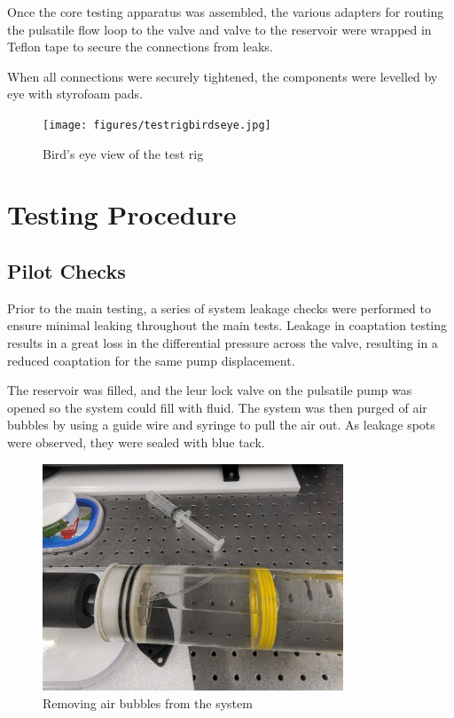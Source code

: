 Once the core testing apparatus was assembled, the various adapters for routing the pulsatile flow loop to the valve and valve to the reservoir were wrapped in Teflon tape to secure the connections from leaks.

When all connections were securely tightened, the components were levelled by eye with styrofoam pads.
\begin{figure}
    \centering
    \texttt{[image: figures/testrigbirdseye.jpg]}
    \caption{Bird's eye view of the test rig}
    \label{fig:rig}
\end{figure}
\section{Testing Procedure}

\subsection{Pilot Checks}
Prior to the main testing, a series of system leakage checks were performed to ensure minimal leaking throughout the main tests. Leakage in coaptation testing results in a great loss in the differential pressure across the valve, resulting in a reduced coaptation for the same pump displacement.

The reservoir was filled, and the leur lock valve on the pulsatile pump was opened so the system could fill with fluid. The system was then purged of air bubbles by using a guide wire and syringe to pull the air out. As leakage spots were observed, they were sealed with blue tack.
\begin{figure}
    \centering
    \includegraphics[width=0.8\textwidth]{figures/suckingoutbubbles.jpg}
    \caption{Removing air bubbles from the system}
    \label{fig:leakcheck}
\end{figure}

